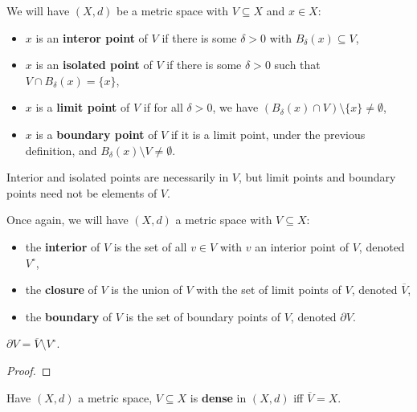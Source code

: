 \documentclass[../Year2.tex]{subfiles}
\begin{document}
\begin{definition}
    We will have $(X,d)$ be a metric space with $V\subseteq X$ and $x\in X$: \begin{itemize}
        \item $x$ is an \textbf{interor point} of $V$ if there is some $\delta>0$ with $B_\delta(x)\subseteq V$,
        \item $x$ is an \textbf{isolated point} of $V$ if there is some $\delta>0$ such that $V\cap B_\delta(x)=\{x\}$,
        \item $x$ is a \textbf{limit point} of $V$ if for all $\delta>0$, we have $(B_\delta(x)\cap V)\setminus\{x\}\neq\emptyset$, 
        \item $x$ is a \textbf{boundary point} of $V$ if it is  a limit point, under the previous definition, and $B_\delta(x)\setminus V\neq \emptyset$.
    \end{itemize}
\end{definition}

\begin{remark}
    Interior and isolated points are necessarily in $V$, but limit points and boundary points need not be elements of $V$.
\end{remark}

\begin{definition}
    Once again, we will have $(X,d)$ a metric space with $V\subseteq X$: \begin{itemize}
        \item the \textbf{interior} of $V$ is the set of all $v\in V$ with $v$ an interior point of $V$, denoted $V^\circ$,
        \item the \textbf{closure} of $V$ is the union of $V$ with the set of limit points of $V$, denoted $\overline{V}$,
        \item the \textbf{boundary} of $V$ is the set of boundary points of $V$, denoted $\partial V$.
    \end{itemize}
\end{definition}

\begin{proposition}
    $\partial V=\overline{V}\setminus V^\circ$.
    \begin{proof}
        
    \end{proof}
\end{proposition}

\begin{definition}
    Have $(X,d)$ a metric space, $V\subseteq X$ is \textbf{dense} in $(X,d)$ iff $\overline{V}=X$.
\end{definition}
\end{document}
